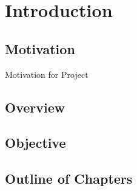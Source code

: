 \chapter{Introduction}
\section{Motivation}
Motivation for Project

\section{Overview}

\section{Objective}

\section{Outline of Chapters}